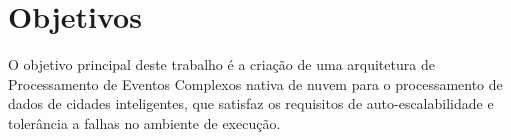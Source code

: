 


\section{Objetivos}
\label{sec:objetivo}

O objetivo principal deste trabalho é a criação de uma arquitetura de Processamento de Eventos Complexos nativa de nuvem para o processamento de dados de cidades inteligentes, que satisfaz os requisitos de auto-escalabilidade e tolerância a falhas no ambiente de execução. 

 
